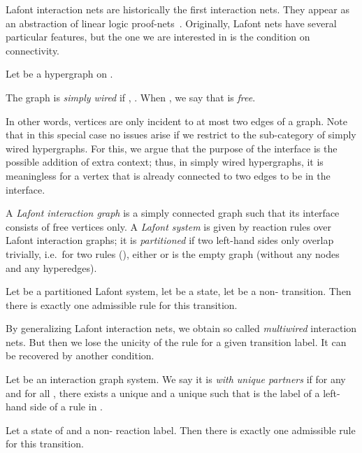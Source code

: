 \begin{example}
  Lafont interaction nets are historically the first interaction nets. 
  They appear as an abstraction of linear logic proof-nets~\cite{Laf95}.
  Originally, 
  Lafont nets have several particular features, but the one we are interested in is the condition on connectivity.
\begin{definition}
  Let  be a hypergraph on .


  The graph  is \emph{simply wired} if , .
  When , 
  we say that  is \emph{free}.
\end{definition}

In other words, vertices are only incident to  at most two edges of a graph.
Note that in this special case 
no issues arise if we restrict to the sub-category of simply wired hypergraphs.
For this, we argue that the purpose of the interface is the possible addition of extra context; 
thus, in simply wired hypergraphs, 
it is meaningless for a vertex that is already connected to two edges to be in the interface.

\begin{definition}
  A \emph{Lafont interaction graph} is a simply connected graph such that its interface consists  of free vertices only.
  A \emph{Lafont system}  is given by  reaction rules over Lafont interaction graphs;
  it is \emph{partitioned} if two left-hand sides only overlap trivially, 
  i.e.\ for two rules  (), 
  either  or  is the empty graph (without any nodes and any hyperedges). 
\end{definition}

\begin{lemma}
  Let  be a partitioned Lafont system, 
  let  be a state, let  be a non- transition.
  Then there is exactly one  admissible rule for this transition.
\label{lem:therule1}
\end{lemma}
\end{example}



\begin{example}
  By generalizing Lafont interaction nets, we obtain so called \emph{multiwired} interaction nets. 
  But then we lose the unicity of the rule for a given transition label.
  It can be recovered by another condition.


  \begin{definition}
    Let  be an interaction graph system.
    We say it is \emph{with unique partners} if for any  and for all , 
    there exists a unique  and a unique  such that  is the label of a left-hand side of a rule in .
  \end{definition}


  \begin{lemma}
    Let  a state of\/  and  a non- reaction label.
    Then there is exactly one  admissible rule  for this transition.
    \label{lem:therule2}
  \end{lemma}
\end{example}



